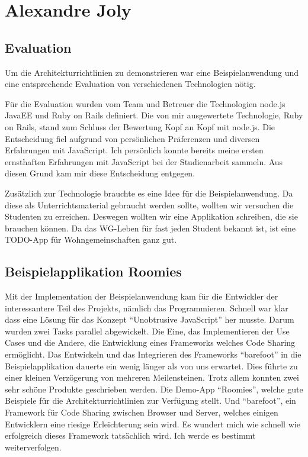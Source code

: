 \section{Alexandre Joly}





\subsection*{Evaluation}
Um die Architekturrichtlinien zu demonstrieren war eine Beispielanwendung und eine entsprechende Evaluation von verschiedenen Technologien nötig.

Für die Evaluation wurden vom Team und Betreuer die Technologien node.js JavaEE und Ruby on Rails definiert. Die von mir ausgewertete Technologie, Ruby on Rails, stand zum Schluss der Bewertung Kopf an Kopf mit node.js. Die Entscheidung fiel aufgrund von persönlichen Präferenzen und diversen Erfahrungen mit JavaScript. Ich persönlich konnte bereits meine ersten ernsthaften Erfahrungen mit JavaScript bei der Studienarbeit sammeln. Aus diesen Grund kam mir diese Entscheidung entgegen.

Zusätzlich zur Technologie brauchte es eine Idee für die Beispielanwendung. Da diese als Unterrichtsmaterial gebraucht werden sollte, wollten wir versuchen die Studenten zu erreichen. Deswegen wollten wir eine Applikation schreiben, die sie brauchen können. Da das WG-Leben für fast jeden Student bekannt ist, ist eine TODO-App für Wohngemeinschaften ganz gut.

\subsection*{Beispielapplikation Roomies}
Mit der Implementation der Beispielanwendung kam für die Entwickler der interessantere Teil des Projekts, nämlich das Programmieren.
Schnell war klar dass eine Lösung für das Konzept ``Unobtrusive JavaScript'' her musste. Darum wurden zwei Tasks parallel abgewickelt. Die Eine, das Implementieren der Use Cases und die Andere, die Entwicklung eines Frameworks welches Code Sharing ermöglicht. Das Entwickeln und das Integrieren des Frameworks ``barefoot'' in die Beispielapplikation dauerte ein wenig länger als von uns erwartet. Dies führte zu einer kleinen Verzögerung von mehreren Meilensteinen. Trotz allem konnten zwei sehr schöne Produkte geschrieben werden. Die Demo-App ``Roomies'', welche gute Beispiele für die Architekturrichtlinien zur Verfügung stellt. Und ``barefoot'', ein Framework für Code Sharing zwischen Browser und Server, welches einigen Entwicklern eine riesige Erleichterung sein wird. Es wundert mich wie schnell wie erfolgreich dieses Framework tatsächlich wird. Ich werde es bestimmt weiterverfolgen.

